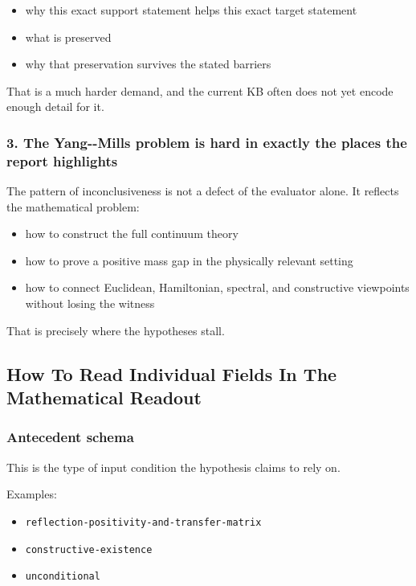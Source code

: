 \documentclass[
]{article}
\providecommand{\tightlist}{%
  \setlength{\itemsep}{0pt}\setlength{\parskip}{0pt}}
\begin{document}
\begin{itemize}
\tightlist
\item
  why this exact support statement helps this exact target statement
\item
  what is preserved
\item
  why that preservation survives the stated barriers
\end{itemize}

That is a much harder demand, and the current KB often does not yet
encode enough detail for it.

\subsubsection{3. The Yang-\/-Mills problem is hard in exactly the
places the report
highlights}\label{3-the-yang--mills-problem-is-hard-in-exactly-the-places-the-report-highlights}

The pattern of inconclusiveness is not a defect of the evaluator alone.
It reflects the mathematical problem:

\begin{itemize}
\tightlist
\item
  how to construct the full continuum theory
\item
  how to prove a positive mass gap in the physically relevant setting
\item
  how to connect Euclidean, Hamiltonian, spectral, and constructive
  viewpoints without losing the witness
\end{itemize}

That is precisely where the hypotheses stall.

\subsection{How To Read Individual Fields In The Mathematical
Readout}\label{how-to-read-individual-fields-in-the-mathematical-readout}

\subsubsection{Antecedent schema}\label{antecedent-schema}

This is the type of input condition the hypothesis claims to rely on.

Examples:

\begin{itemize}
\tightlist
\item
  \texttt{reflection-positivity-and-transfer-matrix}
\item
  \texttt{constructive-existence}
\item
  \texttt{unconditional}
\end{itemize}
\end{document}

